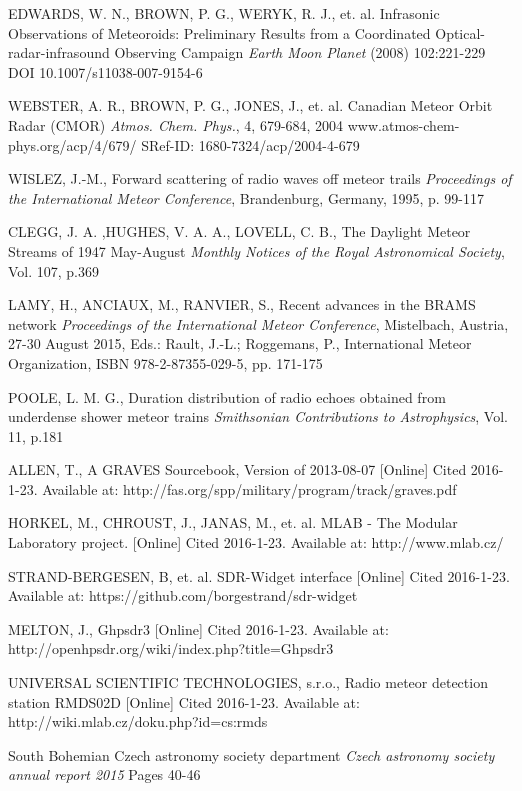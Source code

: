 \documentclass[twoside]{ctuthesis}
\theoremstyle{plain}
\theoremstyle{definition}
\theoremstyle{note}
\begin{document}
\begin{thebibliography}{99}
EDWARDS, W. N., BROWN, P. G., WERYK, R. J., et. al.
Infrasonic Observations of Meteoroids: Preliminary Results from a Coordinated Optical-radar-infrasound Observing Campaign
\emph{Earth Moon Planet} (2008) 102:221-229
DOI 10.1007/s11038-007-9154-6

WEBSTER, A. R., BROWN, P. G., JONES, J., et. al.
Canadian Meteor Orbit Radar (CMOR)
\emph{Atmos. Chem. Phys.}, 4, 679-684, 2004
www.atmos-chem-phys.org/acp/4/679/
SRef-ID: 1680-7324/acp/2004-4-679

WISLEZ, J.-M.,
Forward scattering of radio waves off meteor trails
\emph{Proceedings of the International Meteor Conference}, Brandenburg, Germany, 1995, p. 99-117

CLEGG, J. A. ,HUGHES,  V. A. A., LOVELL, C. B., 
The Daylight Meteor Streams of 1947 May-August
\emph{Monthly Notices of the Royal Astronomical Society}, Vol. 107, p.369

LAMY, H., ANCIAUX, M., RANVIER, S.,
Recent advances in the BRAMS network
\emph{Proceedings of the International Meteor Conference}, Mistelbach, Austria, 27-30 August 2015, Eds.: Rault, J.-L.; Roggemans, P., International Meteor Organization, ISBN 978-2-87355-029-5, pp. 171-175

POOLE, L. M. G.,
Duration distribution of radio echoes obtained from underdense shower meteor trains
\emph{Smithsonian Contributions to Astrophysics}, Vol. 11, p.181

ALLEN, T.,
A GRAVES Sourcebook, Version of 2013-08-07
[Online] Cited 2016-1-23. Available at: http://fas.org/spp/military/program/track/graves.pdf

HORKEL, M., CHROUST, J., JANAS, M., et. al. 
MLAB - The Modular Laboratory project.
[Online] Cited 2016-1-23. Available at: http://www.mlab.cz/

STRAND-BERGESEN, B, et. al.
SDR-Widget interface
[Online] Cited 2016-1-23. Available at: https://github.com/borgestrand/sdr-widget

MELTON, J.,
Ghpsdr3
[Online] Cited 2016-1-23. Available at: http://openhpsdr.org/wiki/index.php?title=Ghpsdr3

UNIVERSAL SCIENTIFIC TECHNOLOGIES, s.r.o.,  
Radio meteor detection station RMDS02D
[Online] Cited 2016-1-23. Available at: http://wiki.mlab.cz/doku.php?id=cs:rmds

South Bohemian Czech astronomy society department
\emph{Czech astronomy society annual report 2015}
Pages 40-46


\end{thebibliography}
\end{document}
